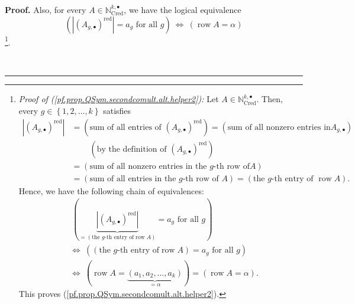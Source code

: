\documentclass[numbers=enddot,12pt,final,onecolumn,notitlepage,abstracton]{scrartcl}%
\theoremstyle{definition}
\newenvironment{proof}[1][Proof]{\noindent\textbf{#1.} }{\ \rule{0.5em}{0.5em}}
\begin{document}
\begin{proof}
Also, for every $A\in\mathbb{N}_{\operatorname*{Cred}}^{k,\bullet}$, we
have the logical equivalence%
\begin{equation}
\left(  \left\vert \left(  A_{g,\bullet}\right)  ^{\operatorname*{red}%
}\right\vert =a_{g}\text{ for all }g\right)  \ \Longleftrightarrow\ \left(
\operatorname*{row}A=\alpha\right)
\label{pf.prop.QSym.secondcomult.alt.helper2}%
\end{equation}
\footnote{\textit{Proof of (\ref{pf.prop.QSym.secondcomult.alt.helper2}):} Let
$A\in\mathbb{N}_{\operatorname*{Cred}}^{k,\bullet}$. Then, every $g\in\left\{
1,2,\ldots,k\right\}  $ satisfies
\begin{align*}
\left\vert \left(  A_{g,\bullet}\right)  ^{\operatorname*{red}}\right\vert  &
=\left(  \text{sum of all entries of }\left(  A_{g,\bullet}\right)
^{\operatorname*{red}}\right)  =\left(  \text{sum of all nonzero entries in
}A_{g,\bullet}\right) \\
&  \ \ \ \ \ \ \ \ \ \ \left(  \text{by the definition of }\left(
A_{g,\bullet}\right)  ^{\operatorname*{red}}\right) \\
&  =\left(  \text{sum of all nonzero entries in the }g\text{-th row of
}A\right) \\
&  =\left(  \text{sum of all entries in the }g\text{-th row of }A\right)
=\left(  \text{the }g\text{-th entry of }\operatorname*{row}A\right)  .
\end{align*}
Hence, we have the following chain of equivalences:%
\begin{align*}
&  \ \left(  \underbrace{\left\vert \left(  A_{g,\bullet}\right)
^{\operatorname*{red}}\right\vert }_{=\left(  \text{the }g\text{-th entry of
}\operatorname*{row}A\right)  }=a_{g}\text{ for all }g\right) \\
&  \Longleftrightarrow\ \left(  \left(  \text{the }g\text{-th entry of
}\operatorname*{row}A\right)  =a_{g}\text{ for all }g\right) \\
&  \Longleftrightarrow\ \left(  \operatorname*{row}A=\underbrace{\left(
a_{1},a_{2},\ldots,a_{k}\right)  }_{=\alpha}\right)  =\left(
\operatorname*{row}A=\alpha\right)  .
\end{align*}
This proves (\ref{pf.prop.QSym.secondcomult.alt.helper2}).}.


\end{proof}
\end{document}
